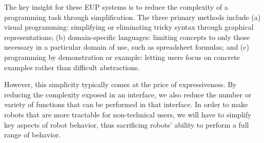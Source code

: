 \documentclass[10pt,twocolumn]{article}
\begin{document}
The key insight for these EUP systems is to reduce the complexity of a programming task through simplification. The three primary methods include (a) visual programming: simplifying or eliminating tricky syntax through graphical representations; (b) domain-specific languages: limiting concepts to only those necessary in a particular domain of use, such as spreadsheet formulas; and (c) programming by demonstration or example: letting users focus on concrete examples rather than difficult abstractions.

However, this simplicity typically comes at the price of expressiveness. By reducing the complexity exposed in an interface, we also reduce the number or variety of functions that can be performed in that interface. In order to make robots that are more tractable for non-technical users, we will have to simplify key aspects of robot behavior, thus sacrificing robots' ability to perform a full range of behavior.



\end{document}
